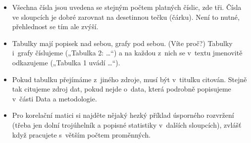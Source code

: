 \documentclass[11pt,a4paper]{article}
\begin{document}
\begin{itemize}[itemsep=2pt, topsep=2pt]
  \item Všechna čísla jsou uvedena se stejným počtem platných číslic, zde tři. Čísla ve sloupcích je dobré zarovnat na desetinnou tečku (čárku). Není to nutné, přehlednost se tím ale zvýší.
  \item Tabulky mají popisek nad sebou, grafy pod sebou. (Víte proč?) Tabulky i~grafy číslujeme („Tabulka 2: \ldots“) a na každou z~nich se v~textu jmenovitě odkazujeme („Tabulka 1 uvádí \ldots“).
  \item Pokud tabulku přejímáme z~jiného zdroje, musí být v~titulku citován. Stejně tak citujeme zdroj dat, pokud nejde o~data, která podrobně popisujeme v~části Data a metodologie.
  \item Pro korelační matici si najděte nějaký hezký příklad úsporného rozvržení (třeba jen dolní trojúhelník a popisné statistiky v~dalších sloupcích), zvlášť když pracujete s~větším počtem proměnných.
\end{itemize}
\end{document}
